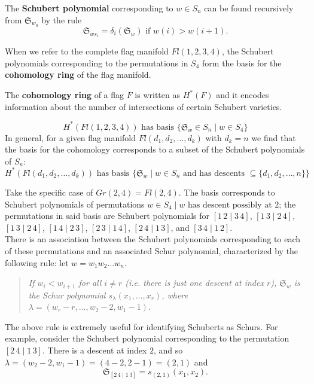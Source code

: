 \documentclass[11pt]{article}
\begin{document}
\begin{definition}
The \textbf{Schubert polynomial} corresponding to $w \in S_n$ can be found recursively from $\mathfrak{S}_{w_0}$ by the rule
\[
    \mathfrak{S}_{ws_i} = \delta_i(\mathfrak{S}_w) \text{ if $w(i) > w(i+1)$}.
\]
\end{definition}


When we refer to the complete flag manifold $Fl(1,2,3,4)$, the Schubert polynomials corresponding to the permutations in $S_4$ form the basis for the \textbf{cohomology ring} of the flag manifold.
\begin{definition}
The \textbf{cohomology ring} of a flag $F$ is written as $H^*(F)$ and it encodes information about the number of intersections of certain Schubert varieties.
\end{definition}
\[
    H^*(Fl(1, 2, 3, 4)) \text{ has basis } \{\mathfrak{S}_w \in S_n \mid w \in S_4 \} 
\]
In general, for a given flag manifold $Fl(d_1, d_2, \dots, d_k)$ with $d_k = n$ we find that the basis for the cohomology corresponds to a subset of the Schubert polynomials of $S_n$:
\[
    H^*(Fl(d_1, d_2, \dots, d_k)) \text{ has basis } \{\mathfrak{S}_w \mid w \in S_n \text{ and has descents } \subseteq \{ d_1, d_2, \dots, n\} \}
\]

Take the specific case of $Gr(2, 4) = Fl(2, 4)$. The basis corresponds to Schubert polynomials of permutations $w \in S_4 \mid w \text{ has descent possibly at $2$}$; the permutations in said basis are Schubert polynomials for $[1\, 2 \mid 3 \,4]$, $[1\,3 \mid 2\,4]$, $[1\, 3 \mid 2\,4]$, $[1\,4 \mid 2\,3]$, $[2\,3 \mid 1\,4]$, $[2\,4 \mid 1\,3]$, and $[3\,4 \mid 1\,2]$. \\

There is an association between the Schubert polynomials corresponding to each of these permutations and an associated Schur polynomial, characterized by the following rule: let $w = w_1 w_2 \dots w_n$. 
\begin{quote}
\textit{If $w_i < w_{i+1}$ for all $i \neq r$ (i.e. there is just one descent at index $r$), $\mathfrak{S}_w$ is the Schur polynomial $s_\lambda(x_1, \dots, x_r)$, where $\lambda = (w_r - r, \dots, w_2 - 2, w_1 - 1)$.}
\end{quote}

The above rule is extremely useful for identifying Schuberts as Schurs. For example, consider the Schubert polynomial corresponding to the permutation $[2\,4 \mid 1\,3]$. There is a descent at index $2$, and so $\lambda = (w_2 - 2, w_1 - 1) = (4 - 2, 2 - 1) = (2, 1)$ and
\[
    \mathfrak{S}_{[2\,4 \mid 1\,3]} = s_{(2, 1)}(x_1, x_2).
\]
\end{document}
